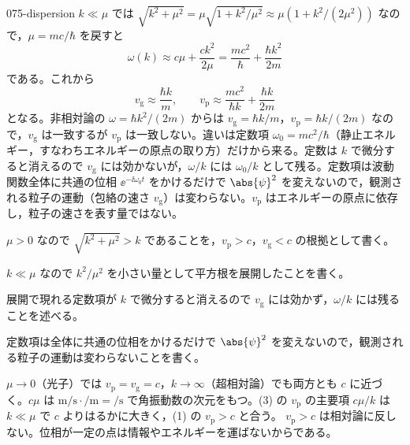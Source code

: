 \documentclass[uplatex,dvipdfmx,a4paper,11pt]{jsarticle}
\begin{document}
\begin{kaisetsu}{075-dispersion}
 $k\ll\mu$ では $\sqrt{k^{2}+\mu^{2}}=\mu\sqrt{1+k^{2}/\mu^{2}}\approx\mu(1+k^{2}/(2\mu^{2}))$ なので，$\mu=mc/\hbar$ を戻すと
\[ \omega(k)\approx c\mu+\frac{ck^{2}}{2\mu}=\frac{mc^{2}}{\hbar}+\frac{\hbar k^{2}}{2m} \]
である。これから
\[ v_{\mathrm{g}}\approx\frac{\hbar k}{m},\qquad v_{\mathrm{p}}\approx\frac{mc^{2}}{\hbar k}+\frac{\hbar k}{2m} \]
となる。非相対論の $\omega=\hbar k^{2}/(2m)$ からは $v_{\mathrm{g}}=\hbar k/m$，$v_{\mathrm{p}}=\hbar k/(2m)$ なので，$v_{\mathrm{g}}$ は一致するが $v_{\mathrm{p}}$ は一致しない。違いは定数項 $\omega_{0}=mc^{2}/\hbar$（静止エネルギー，すなわちエネルギーの原点の取り方）だけから来る。定数は $k$ で微分すると消えるので $v_{\mathrm{g}}$ には効かないが，$\omega/k$ には $\omega_{0}/k$ として残る。定数項は波動関数全体に共通の位相 $\ee^{-\ii\omega_{0}t}$ をかけるだけで $\abs{\psi}^{2}$ を変えないので，観測される粒子の運動（包絡の速さ $v_{\mathrm{g}}$）は変わらない。$v_{\mathrm{p}}$ はエネルギーの原点に依存し，粒子の速さを表す量ではない。
\begin{ronten}
  \item {} $\mu>0$ なので $\sqrt{k^{2}+\mu^{2}}>k$ であることを，$v_{\mathrm{p}}>c$，$v_{\mathrm{g}}<c$ の根拠として書く。
  \item {} $k\ll\mu$ なので $k^{2}/\mu^{2}$ を小さい量として平方根を展開したことを書く。
  \item {} 展開で現れる定数項が $k$ で微分すると消えるので $v_{\mathrm{g}}$ には効かず，$\omega/k$ には残ることを述べる。
  \item {} 定数項は全体に共通の位相をかけるだけで $\abs{\psi}^{2}$ を変えないので，観測される粒子の運動は変わらないことを書く。
\end{ronten}
\kenzan $\mu\to0$（光子）では $v_{\mathrm{p}}=v_{\mathrm{g}}=c$，$k\to\infty$（超相対論）でも両方とも $c$ に近づく。$c\mu$ は $\unit{\metre\per\second}\cdot\unit{\per\metre}=\unit{\per\second}$ で角振動数の次元をもつ。(3) の $v_{\mathrm{p}}$ の主要項 $c\mu/k$ は $k\ll\mu$ で $c$ よりはるかに大きく，(1) の $v_{\mathrm{p}}>c$ と合う。
\tsumazuki $v_{\mathrm{p}}>c$ は相対論に反しない。位相が一定の点は情報やエネルギーを運ばないからである。
\end{kaisetsu}
\end{document}
